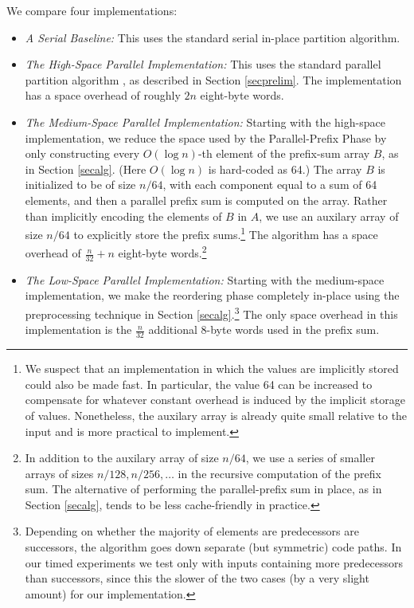 \documentclass[sigplan, twocolumn]{amsart}
\theoremstyle{remark}
\theoremstyle{remark}
\begin{document}
We compare four implementations:
\begin{itemize}[leftmargin = .15in]
\item \emph{A Serial Baseline:} This uses the standard serial in-place
partition algorithm.
\item \emph{The High-Space Parallel Implementation:} This uses the
  standard parallel partition algorithm \cite{Blelloch96,AcarBl16}, as
  described in Section \ref{secprelim}. The implementation has a space
  overhead of roughly $2n$ eight-byte words.
\item \emph{The Medium-Space Parallel Implementation:} Starting with
  the high-space implementation, we reduce the space used by the
  Parallel-Prefix Phase by only constructing every $O(\log n)$-th
  element of the prefix-sum array $B$, as in Section
  \ref{secalg}. (Here $O(\log n)$ is hard-coded as 64.) The array $B$
  is initialized to be of size $n / 64$, with each component equal to
  a sum of 64 elements, and then a parallel prefix sum is computed on
  the array. Rather than implicitly encoding the elements of $B$ in
  $A$, we use an auxilary array of size $n / 64$ to explicitly store
  the prefix sums.\footnote{We suspect that an implementation in which
    the values are implicitly stored could also be made fast. In
    particular, the value 64 can be increased to compensate for
    whatever constant overhead is induced by the implicit storage of
    values. Nonetheless, the auxilary array is already quite small
    relative to the input and is more practical to implement.} The algorithm
  has a space overhead of $\frac{n}{32} + n$ eight-byte
  words.\footnote{In addition to the auxilary array of size $n / 64$,
    we use a series of smaller arrays of sizes $n / 128, n / 256,
    \ldots$ in the recursive computation of the prefix sum. The
    alternative of performing the parallel-prefix sum in place, as in
    Section \ref{secalg}, tends to be less cache-friendly in
    practice.}
\item \emph{The Low-Space Parallel Implementation:}
Starting with the medium-space implementation, we make the reordering
phase completely in-place using the preprocessing technique in Section
\ref{secalg}.\footnote{Depending on whether the majority of elements
  are predecessors are successors, the algorithm goes down separate
  (but symmetric) code paths. In our timed experiments we test only
  with inputs containing more predecessors than successors, since this
  the slower of the two cases (by a very slight amount) for our
  implementation.} The only space overhead in this implementation is
the $\frac{n}{32}$ additional 8-byte words used in the prefix sum.
\end{itemize}
\end{document}
